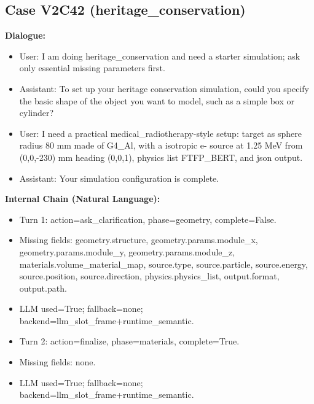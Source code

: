 \documentclass[11pt]{ctexart}
\begin{document}
\subsection{Case V2C42 (heritage\_conservation)}
\textbf{Dialogue:}
\begin{itemize}
\item User: I am doing heritage\_conservation and need a starter simulation; ask only essential missing parameters first.
\item Assistant: To set up your heritage conservation simulation, could you specify the basic shape of the object you want to model, such as a simple box or cylinder?
\item User: I need a practical medical\_radiotherapy-style setup: target as sphere radius 80 mm made of G4\_Al, with a isotropic e- source at 1.25 MeV from (0,0,-230) mm heading (0,0,1), physics list FTFP\_BERT, and json output.
\item Assistant: Your simulation configuration is complete.
\end{itemize}
\textbf{Internal Chain (Natural Language):}
\begin{itemize}
\item Turn 1: action=ask\_clarification, phase=geometry, complete=False.
\item Missing fields: geometry.structure, geometry.params.module\_x, geometry.params.module\_y, geometry.params.module\_z, materials.volume\_material\_map, source.type, source.particle, source.energy, source.position, source.direction, physics.physics\_list, output.format, output.path.
\item LLM used=True; fallback=none; backend=llm\_slot\_frame+runtime\_semantic.
\item Turn 2: action=finalize, phase=materials, complete=True.
\item Missing fields: none.
\item LLM used=True; fallback=none; backend=llm\_slot\_frame+runtime\_semantic.
\end{itemize}
\end{document}
